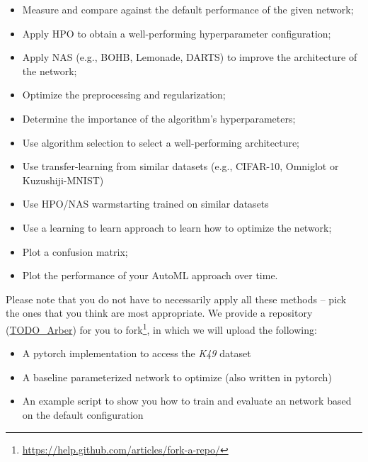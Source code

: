 \documentclass[10pt,a4paper]{article}
\begin{document}
		\begin{itemize}
			\item Measure and compare against the default performance of the given network;
			\item Apply HPO to obtain a well-performing hyperparameter configuration;
			\item Apply NAS (e.g., BOHB, Lemonade, DARTS) to improve the architecture of the network;
			\item Optimize the preprocessing and regularization;
			\item Determine the importance of the algorithm's hyperparameters;
			\item Use algorithm selection to select a well-performing architecture;
			\item Use transfer-learning from similar datasets (e.g., CIFAR-10, Omniglot or Kuzushiji-MNIST)
			\item Use HPO/NAS warmstarting trained on similar datasets 
			\item Use a learning to learn approach to learn how to optimize the network;
			\item Plot a confusion matrix;
			\item Plot the performance of your AutoML approach over time.
		\end{itemize}
		\noindent
		Please note that you do not have to necessarily apply all these methods -- pick the ones that you think are most appropriate.
		We provide a repository (\url{TODO_Arber}) for you to fork\footnote{\url{https://help.github.com/articles/fork-a-repo/}}, in which we will upload the following:
		\begin{itemize}
			\item A pytorch implementation to access the \textit{K49} dataset
			\item A baseline parameterized network to optimize (also written in pytorch)
			\item An example script to show you how to train and evaluate an network based on the default configuration
		\end{itemize}
\end{document}
